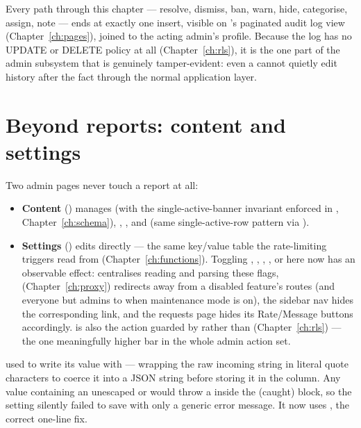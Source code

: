 Every path through this chapter — resolve, dismiss, ban, warn, hide, categorise, assign, note — ends at exactly one  insert, visible on 's paginated audit log view (Chapter~\ref{ch:pages}), joined to the acting admin's profile. Because the log has no UPDATE or DELETE policy at all (Chapter~\ref{ch:rls}), it is the one part of the admin subsystem that is genuinely tamper-evident: even a  cannot quietly edit history after the fact through the normal application layer.

\section{Beyond reports: content and settings}

Two admin pages never touch a report at all:

\begin{itemize}
  \item \textbf{Content} () manages  (with the single-active-banner invariant enforced in , Chapter~\ref{ch:schema}), , , and  (same single-active-row pattern via ).
  \item \textbf{Settings} () edits  directly — the same key/value table the rate-limiting triggers read from (Chapter~\ref{ch:functions}). Toggling , , , , or  here now has an observable effect:  centralises reading and parsing these flags,  (Chapter~\ref{ch:proxy}) redirects away from a disabled feature's routes (and everyone but admins to  when maintenance mode is on), the sidebar nav hides the corresponding link, and the requests page hides its Rate/Message buttons accordingly.  is also the action guarded by  rather than  (Chapter~\ref{ch:rls}) — the one meaningfully higher bar in the whole admin action set.
\end{itemize}

\begin{olknote}
 used to write its value with  — wrapping the raw incoming string in literal quote characters to coerce it into a JSON string before storing it in the  column. Any value containing an unescaped  or \code{\textbackslash} would throw a  inside the (caught)  block, so the setting silently failed to save with only a generic error message. It now uses , the correct one-line fix.
\end{olknote}

